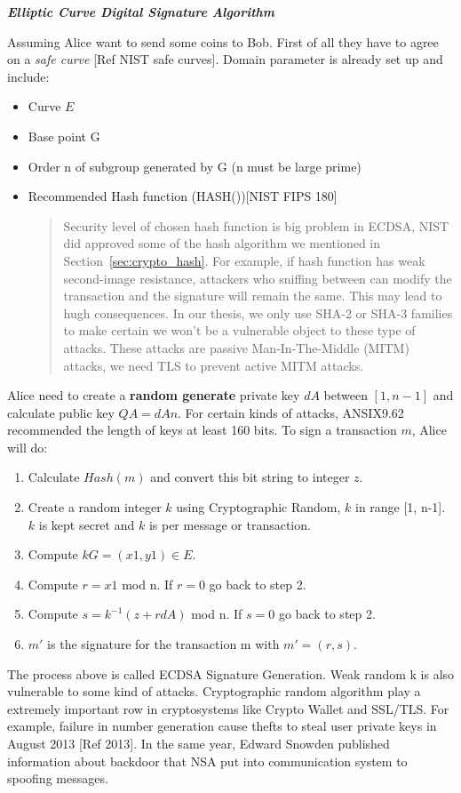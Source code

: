 \bigskip
{\textit {\textbf{Elliptic Curve Digital Signature Algorithm}}}

Assuming Alice want to send some coins to Bob. First of all they have to agree on a \emph{safe curve} [Ref NIST safe curves].
Domain parameter is already set up and include:
\begin{itemize}
	\item Curve $E$
	\item Base point G 
	\item Order n of subgroup generated by G (n must be large prime)
	\item Recommended Hash function (HASH())[NIST FIPS 180]
		\begin{quote}
			Security level of chosen hash function is big problem in ECDSA, NIST did approved some of the hash algorithm we mentioned in Section~\ref{sec:crypto_hash}. 
			For example, if hash function has weak second-image resistance, attackers who sniffing between can modify the transaction and the signature will remain the same.
			This may lead to hugh consequences.
			In our thesis, we only use SHA-2 or SHA-3 families to make certain we won't be a vulnerable object to these type of attacks. These attacks are passive Man-In-The-Middle (MITM) attacks, we need TLS to prevent active MITM attacks.
		\end{quote}
\end{itemize}
 
Alice need to create a {\bf random generate} private key $dA$ between $[1, n-1]$ and calculate public key $QA = dAn$. 
For certain kinds of attacks, ANSIX9.62 recommended the length of keys at least 160 bits.
To sign a transaction $m$, Alice will do:
\begin{enumerate}
	\item Calculate $Hash(m)$ and convert this bit string to integer $z$.
	\item Create a random integer $k$ using Cryptographic Random, $k$ in range [1, n-1]. $k$ is kept secret and $k$ is per message or transaction.
	\item Compute $kG = (x1, y1) \in E$.
	\item Compute $r=x1$ mod n. If $r = 0$ go back to step 2.
	\item Compute $s=k^{-1}(z + rdA)$ mod n. If $s = 0$ go back to step 2.
	\item $m'$ is the signature for the transaction m with $m' = (r, s)$. 
\end{enumerate}
The process above is called ECDSA Signature Generation. 
Weak random k is also vulnerable to some kind of attacks.
Cryptographic random algorithm play a extremely important row in cryptosystems like Crypto Wallet and SSL/TLS.
For example, failure in number generation cause thefts to steal user private keys in August 2013 [Ref 2013]. 
In the same year, Edward Snowden published information about backdoor that NSA put into communication system to spoofing messages.


